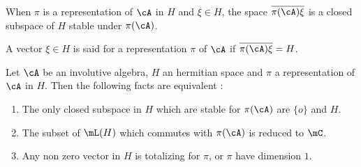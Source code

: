 When $\pi$ is a representation of $\cA$ in $H$ and $\xi\in H$, the space $\overline{ \pi(\cA)\xi }$ is a closed subspace of $H$ stable under $\pi(\cA)$.

\begin{definition}
A vector $\xi\in H$ is said  for a
representation $\pi$ of $\cA$ if $\overline{ \pi(\cA)\xi }=H$.
\end{definition}

\begin{proposition}
Let $\cA$ be an involutive algebra, $H$ an hermitian space and $\pi$ a representation of $\cA$ in $H$. Then the following facts are equivalent 
:
\begin{enumerate}
\item The only closed subspace in $H$ which are stable for $\pi(\cA)$ 
are $\{o\}$ and $H$.
\item The subset of $\mL(H)$ which commutes with $\pi(\cA)$ is reduced 
to $\mC$.
\item Any non zero vector in $H$ is totalizing for $\pi$, or $\pi$ have 
dimension $1$.
\end{enumerate}
 \label{prop:reprez_topo}
\end{proposition}

